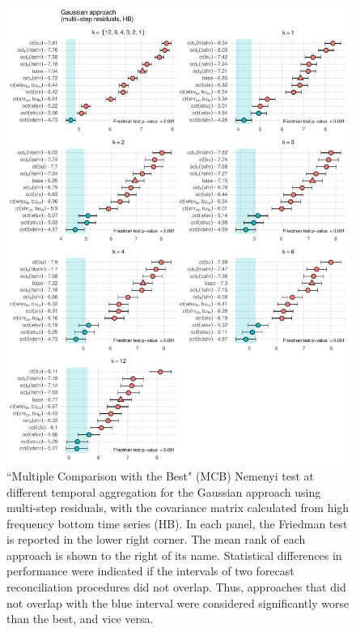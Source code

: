 \documentclass[a4paper,11pt]{article}
\theoremstyle{definition}
\begin{document}
\begin{figure}[p]
	\centering
	\includegraphics[width = \linewidth]{fig/VN525/hbsamh_more.pdf}
	\caption{“Multiple Comparison with the Best" (MCB) Nemenyi test at different temporal aggregation for the Gaussian approach using multi-step residuals, with the covariance matrix calculated from high frequency bottom time series (HB). In each panel, the Friedman test is reported in the lower right corner. The mean rank of each approach is shown to the right of its name. Statistical differences in performance were indicated if the intervals of two forecast reconciliation procedures did not overlap. Thus, approaches that did not overlap with the blue interval were considered significantly worse than the best, and vice versa.}
	\label{fig:vnmcb_h}
\end{figure}
\end{document}
